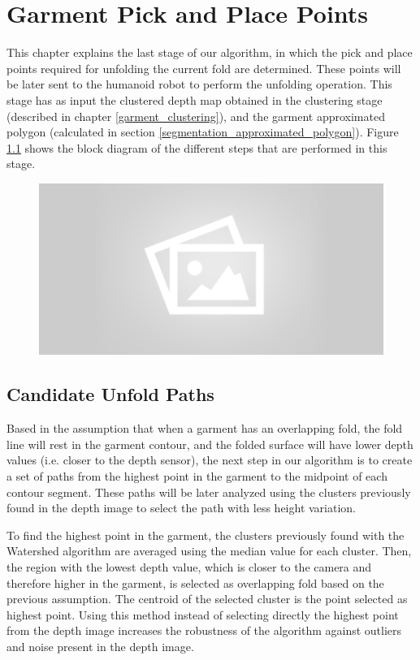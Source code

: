 \chapter{Garment Pick and Place Points}
\label{pick_and_place}
This chapter explains the last stage of our algorithm, in which the pick and place points required for unfolding the current fold are determined. These points will be later sent to the humanoid robot to perform the unfolding operation. This stage has as input the clustered depth map obtained in the clustering stage (described in chapter \ref{garment_clustering}), and the garment approximated polygon (calculated in section \ref{segmentation_approximated_polygon}). Figure \ref{fig:garment_pnp_points_blocks} shows the block diagram of the different steps that are performed in this stage.

\begin{figure}[thpb]
    \centering
    \includegraphics[width=0.7
    \textwidth]{figures/placeholder2.png}
    \caption{}
    \label{fig:garment_pnp_points_blocks}
\end{figure}

\section{Candidate Unfold Paths}
\label{unfold_paths}

Based in the assumption that when a garment has an overlapping fold, the fold line will rest in the garment contour, and the folded surface will have lower depth values (i.e. closer to the depth sensor), the next step in our algorithm is to create a set of paths from the highest point in the garment to the midpoint of each contour segment. These paths will be later analyzed using the clusters previously found in the depth image to select the path with less height variation.

To find the highest point in the garment, the clusters previously found with the Watershed algorithm are averaged using the median value for each cluster. Then, the region with the lowest depth value, which is closer to the camera and therefore higher in the garment, is selected as overlapping fold based on the previous assumption. The centroid of the selected cluster is the point selected as highest point. Using this method instead of selecting directly the highest point from the depth image increases the robustness of the algorithm against outliers and noise present in the depth image.

